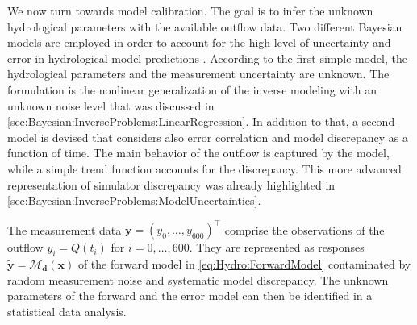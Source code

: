 We now turn towards model calibration.
The goal is to infer the unknown hydrological parameters with the available outflow data.
Two different Bayesian models are employed in order to account for the high level of uncertainty and error in hydrological model predictions \cite{Hydro:DelGiudice2013,Hydro:DelGiudice2015}.
According to the first simple model, the hydrological parameters and the measurement uncertainty are unknown.
The formulation is the nonlinear generalization of the inverse modeling with an unknown noise level that was discussed in \cref{sec:Bayesian:InverseProblems:LinearRegression}.
In addition to that, a second model is devised that considers also error correlation and model discrepancy as a function of time.
The main behavior of the outflow is captured by the model, while a simple trend function accounts for the discrepancy.
This more advanced representation of simulator discrepancy was already highlighted in \cref{sec:Bayesian:InverseProblems:ModelUncertainties}.
\par %
The measurement data \(\bm{y} = (y_0,\ldots,y_{600})^\top\) comprise the observations of the outflow \(y_i = Q(t_i)\) for \(i=0,\ldots,600\).
They are represented as responses \(\tilde{\bm{y}} = \mathcal{M}_{\bm{d}}(\bm{x})\) of the forward model in \cref{eq:Hydro:ForwardModel}
contaminated by random measurement noise and systematic model discrepancy.
The unknown parameters of the forward and the error model can then be identified in a statistical data analysis.

